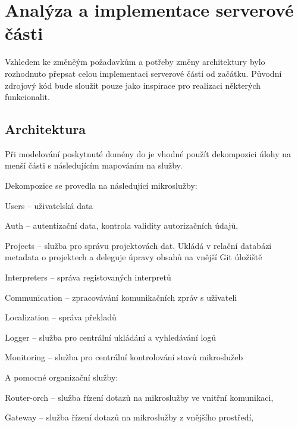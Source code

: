 \chapter{Analýza a implementace serverové části}\label{ch:server}


Vzhledem ke změněým požadavkům a potřeby změny architektury bylo rozhodnuto přepsat celou implementaci serverové části od začátku.
Původní zdrojový kód bude sloužit pouze jako inspirace pro realizaci některých funkcionalit.


\section{Architektura}\label{sec:server-arch}

Při modelování poskytnuté domény do  je vhodné použít dekompozici úlohy na menší části s následujícím mapováním na služby.

Dekompozice se provedla na následující mikroslužby:



\begin{dl}
   \item[Users] – uživatelská data
   \item[Auth] – autentizační data, kontrola validity autorizačních údajů,
   \item[Projects] – služba pro správu projektovách dat.
   Ukládá v relační databázi metadata o projektech a deleguje úpravy obsahů na vnější Git úložiště
   \item[Interpreters] – správa registovaných interpretů
   \item[Communication] – zpracovávání komunikačních zpráv s uživateli
   \item[Localization] – správa překladů
   \item[Logger] – služba pro centrální ukládání a vyhledávání logů
   \item[Monitoring] – služba pro centrální kontrolování stavů mikroslužeb
\end{dl}

A pomocné organizační služby:

\begin{dl}
   \item[Router-orch] – služba řízení dotazů na mikroslužby ve vnitřní komunikaci,
   \item[Gateway] – služba řízení dotazů na mikroslužby z vnějšího prostředí,
\end{dl}

